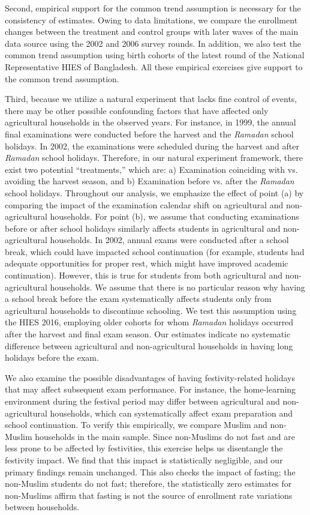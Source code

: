 \documentclass[12pt,letterpaper]{article}
\newcommand{\0}{\ensuremath{\mbox{\boldmath $0$}}}
\begin{document}
Second, empirical support for the common trend assumption is necessary for the consistency of estimates. Owing to data limitations, we compare the enrollment changes between the treatment and control groups with later waves of the main data source using the 2002 and 2006 survey rounds. In addition, we also test the common trend assumption using birth cohorts of the latest round of the National Representative HIES of Bangladesh. All these empirical exercises give support to the common trend assumption.  

Third, because we utilize a natural experiment that lacks fine control of events, there may be other possible confounding factors that have affected only agricultural households in the observed years. For instance, in 1999, the annual final examinations were conducted before the harvest and the \textit{Ramadan} school holidays. In 2002, the examinations were scheduled during the harvest and after \textit{Ramadan} school holidays. Therefore, in our natural experiment framework, there exist two potential ``treatments,'' which are: a) Examination coinciding with vs. avoiding the harvest season, and b) Examination before vs. after the \textit{Ramadan} school holidays. Throughout our analysis, we emphasize the effect of point (a) by comparing the impact of the examination calendar shift on agricultural and non-agricultural households. For point (b), we assume that conducting examinations before or after school holidays similarly affects students in agricultural and non-agricultural households. In 2002, annual exams were conducted after a school break, which could have impacted school continuation (for example, students had adequate opportunities for proper rest, which might have improved academic continuation). However, this is true for students from both agricultural and non-agricultural households. We assume that there is no particular reason why having a school break before the exam systematically affects students only from agricultural households to discontinue schooling. We test this assumption using the HIES 2016, employing older cohorts for whom \textit{Ramadan} holidays occurred after the harvest and final exam season. Our estimates indicate no systematic difference between agricultural and non-agricultural households in having long holidays before the exam. 

We also examine the possible disadvantages of having festivity-related holidays that may affect subsequent exam performance. For instance, the home-learning environment during the festival period may differ between agricultural and non-agricultural households, which can systematically affect exam preparation and school continuation. To verify this empirically, we compare Muslim and non-Muslim households in the main sample. Since non-Muslims do not fast and are less prone to be affected by festivities, this exercise helps us disentangle the festivity impact. We find that this impact is statistically negligible, and our primary findings remain unchanged. This also checks the impact of fasting; the non-Muslim students do not fast; therefore, the statistically zero estimates for non-Muslims affirm that fasting is not the source of enrollment rate variations between households. 
\end{document}
